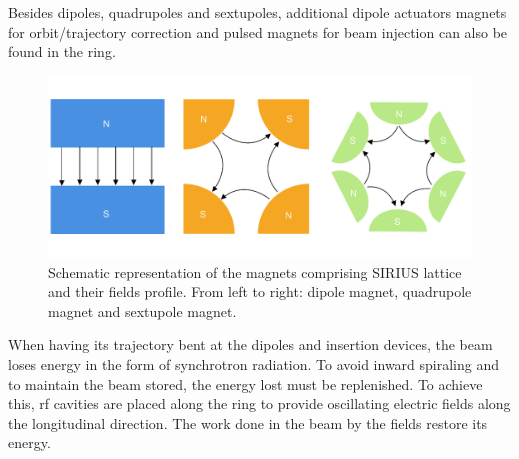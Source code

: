 Besides dipoles, quadrupoles and sextupoles, additional dipole actuators magnets for orbit/trajectory correction and pulsed magnets for beam injection can also be found in the ring.
\begin{figure}[htb]
    \includegraphics[width=\textwidth]{Images/magnets.pdf}
    \caption[Schematic representation of the magnets comprising SIRIUS lattice and their fields profile.]{Schematic representation of the magnets comprising SIRIUS lattice and their fields profile. From left to right: dipole magnet, quadrupole magnet and sextupole magnet.}
    \label{fig:magnets_fields}
\end{figure}

When having its trajectory bent at the dipoles and insertion devices,
the beam loses energy in the form of synchrotron radiation. To avoid inward spiraling and to maintain the beam stored, the energy lost must be replenished. To achieve this, \gls*{rf} cavities are placed along the ring to provide oscillating electric fields along the longitudinal direction. The work done in the beam by the fields restore its energy.

